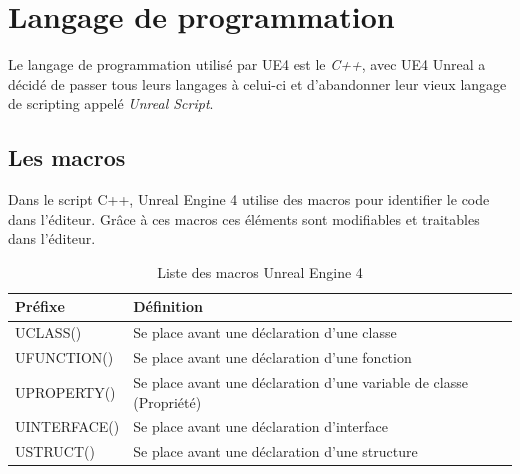 \documentclass[11pt, a4paper, oneside]{article}
\begin{document}
\newpage
\section{Langage de programmation}
Le langage de programmation utilisé par UE4 est le \textit{C++}, avec UE4 Unreal a décidé de passer tous leurs langages à celui-ci et d'abandonner leur vieux langage de scripting appelé \textit{Unreal Script}.

\subsection{Les macros}
Dans le script C++, Unreal Engine 4 utilise des macros pour identifier le code dans l'éditeur. Grâce à ces macros ces éléments sont modifiables et traitables dans l'éditeur.
\begin{table}[h]
	\begin{center}
		\begin{tabularx}{\textwidth}{ l l }
			\hline
			\textbf{Préfixe} & \textbf{Définition}\\
			\hline
			\hline
			UCLASS() & Se place avant une déclaration d'une classe\\
			UFUNCTION() & Se place avant une déclaration d'une fonction\\
			UPROPERTY() & Se place avant une déclaration d'une variable de classe (Propriété)\\
			UINTERFACE() & Se place avant une déclaration d'interface\\
			USTRUCT() & Se place avant une déclaration d'une structure\\
			\hline
		\end{tabularx}
		\caption{Liste des macros Unreal Engine 4}
		\label{table:macros}
	\end{center}
\end{table}
\end{document}

